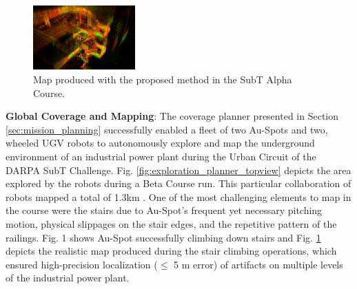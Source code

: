 \documentclass[letterpaper, 10pt, conference]{ieeeconf}      %
\newcommand{\ph}[1]{{\textbf{#1}:}} %
\newcommand{\rev}[1]{{\color{blue} #1 }} %
\begin{document}
\begin{figure}[t!]  %
  \centering
  \includegraphics[width=0.35\textwidth]{graphics/spot_alpha_course_stairs.PNG}
  \caption{Map produced with the proposed method in the SubT Alpha Course.}
  \label{fig:alpha_course_stairs_map}
\end{figure}



\ph{Global Coverage and Mapping}
The coverage planner presented in Section \ref{sec:mission_planning} successfully enabled a fleet of two Au-Spots and two, wheeled UGV robots to autonomously explore and map the underground environment of an industrial power plant during the Urban Circuit of the DARPA SubT Challenge. 
Fig. \ref{fig:exploration_planner_topview} depicts the area explored by the robots during a Beta Course run. This particular collaboration of robots mapped a total of \rev{1.3km}.%
One of the most challenging elements to map in the course were the stairs due to Au-Spot's
frequent yet necessary pitching motion, physical slippages on the stair edges, and the repetitive pattern of  the  railings. Fig.  1  shows Au-Spot successfully climbing down stairs and Fig. \ref{fig:alpha_course_stairs_map} depicts the realistic map produced during the stair climbing operations, which ensured high-precision localization ($\leq$ 5 m error) of artifacts on multiple levels of the industrial power plant.

\end{document}
